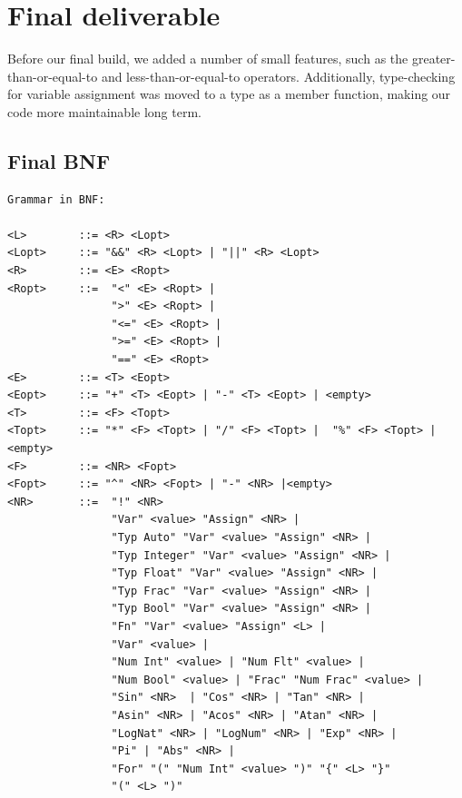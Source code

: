 \documentclass[a4paper, oneside, 11pt]{report}
\begin{document}
    \chapter{Final deliverable}\label{Impl}

    Before our final build, we added a number of small features, such as the greater-than-or-equal-to and less-than-or-equal-to operators. Additionally, type-checking for variable assignment was moved to a type as a member function, making our code more maintainable long term.

    \section{Final BNF}
    \begin{verbatim}
Grammar in BNF:

<L>        ::= <R> <Lopt>
<Lopt>     ::= "&&" <R> <Lopt> | "||" <R> <Lopt>
<R>        ::= <E> <Ropt>
<Ropt>     ::=  "<" <E> <Ropt> |
                ">" <E> <Ropt> |
                "<=" <E> <Ropt> |
                ">=" <E> <Ropt> |
                "==" <E> <Ropt>
<E>        ::= <T> <Eopt>
<Eopt>     ::= "+" <T> <Eopt> | "-" <T> <Eopt> | <empty>
<T>        ::= <F> <Topt>
<Topt>     ::= "*" <F> <Topt> | "/" <F> <Topt> |  "%" <F> <Topt> |<empty>
<F>        ::= <NR> <Fopt>
<Fopt>     ::= "^" <NR> <Fopt> | "-" <NR> |<empty>
<NR>       ::=  "!" <NR>
                "Var" <value> "Assign" <NR> |
                "Typ Auto" "Var" <value> "Assign" <NR> |
                "Typ Integer" "Var" <value> "Assign" <NR> |
                "Typ Float" "Var" <value> "Assign" <NR> |
                "Typ Frac" "Var" <value> "Assign" <NR> |
                "Typ Bool" "Var" <value> "Assign" <NR> |
                "Fn" "Var" <value> "Assign" <L> |
                "Var" <value> |
                "Num Int" <value> | "Num Flt" <value> |
                "Num Bool" <value> | "Frac" "Num Frac" <value> |
                "Sin" <NR>  | "Cos" <NR> | "Tan" <NR> |
                "Asin" <NR> | "Acos" <NR> | "Atan" <NR> |
                "LogNat" <NR> | "LogNum" <NR> | "Exp" <NR> |
                "Pi" | "Abs" <NR> |
                "For" "(" "Num Int" <value> ")" "{" <L> "}"
                "(" <L> ")"
    \end{verbatim}
\end{document}
